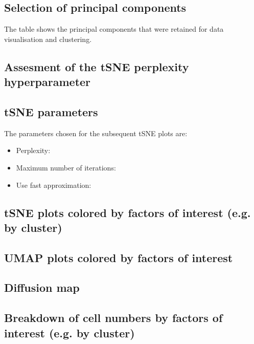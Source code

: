 \subsection{Selection of principal components}

The table shows the principal components that were retained for data visualisation and clustering.




\subsection{Assesment of the tSNE perplexity hyperparameter}


\clearpage

\subsection{tSNE parameters}

The parameters chosen for the subsequent tSNE plots are:

\begin{itemize}
\item Perplexity: \tSNEPerplexity
\item Maximum number of iterations: \tSNEMaxIter
\item Use fast approximation: \tSNEFast
\end{itemize}

\subsection{tSNE plots colored by factors of interest (e.g. by cluster)}



\subsection{UMAP plots colored by factors of interest}



\subsection{Diffusion map}



\subsection{Breakdown of cell numbers by factors of interest (e.g. by cluster)}

